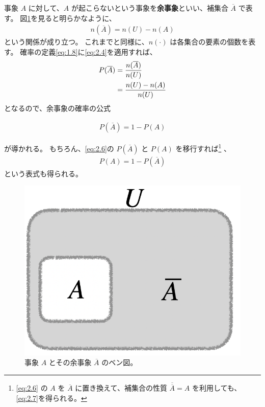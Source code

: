 \documentclass[12pt]{ltjsarticle}\usepackage{ifthen}\newcounter{enlarge}\setcounter{enlarge}{1}
\begin{document}
事象 $A$ に対して、$A$ が起こらないという事象を\textbf{余事象}といい、補集合 $\overline{A}$ で表す。
図\ref{f:2.2}を見ると明らかなように、
\begin{align}
  n(\overline{A}) = n(U) - n(A) \label{eq:2.4}
\end{align}
という関係が成り立つ。
これまでと同様に、$n(\cdot)$ は各集合の要素の個数を表す。
確率の定義\eqref{eq:1.8}に\eqref{eq:2.4}を適用すれば、
\begin{align}
  P(\overline{A}) &= \frac{n(\overline{A})}{n(U)} \notag \\
                  &= \frac{n(U) - n(A)}{n(U)} \label{eq:2.5}
\end{align}
となるので、余事象の確率の公式
\begin{oframed}
  \begin{align}
     P(\overline{A}) = 1 - P(A) \label{eq:2.6}
  \end{align}
\end{oframed}
\noindent
が導かれる。
もちろん、\eqref{eq:2.6}の $P(\overline{A})$ と $P(A)$ を移行すれば\footnote{%
  \eqref{eq:2.6} の $A$ を $\overline{A}$ に置き換えて、補集合の性質 $\overline{\overline{A}} = A$ を利用しても、\eqref{eq:2.7}を得られる。
}
、
\begin{align}
  P(A) = 1 - P(\overline{A}) \label{eq:2.7}
\end{align}
という表式も得られる。


\begin{figure}[] 
\centering 
\includegraphics[width=6truecm]{./figure/f2-2.png}
\captionsetup{width=.9\linewidth}
\caption{%
  事象 $A$ とその余事象 $\overline{A}$ のベン図。
}
\label{f:2.2}
\end{figure}
\end{document}
